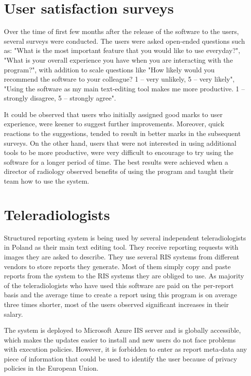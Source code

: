 \documentclass[12pt, twoside, openany]{report}
\theoremstyle{definition}
\begin{document}
\section{User satisfaction surveys}
Over the time of first few months after the release of the software to the  users, several surveys were conducted. The users were asked open-ended questions such as: "What is the most important feature that you would like to use everyday?", "What is your overall experience you have when you are interacting with the program?", with addition to scale questions like "How likely would you recommend the software to your colleague? 1 – very unlikely, 5 – very likely", "Using the software as my main text-editing tool makes me more productive. 1 – strongly disagree, 5 – strongly agree".

It could be observed that users who initially assigned good marks to user experience, were keener to suggest further improvements. Moreover, quick reactions to the suggestions, tended to result in better marks in the subsequent surveys. On the other hand, users that were not interested in using additional tools to be more productive, were very difficult to encourage to try using the software for a longer period of time. The best results were achieved when a director of radiology observed benefits of using the program and taught their team how to use the system.


\section{Teleradiologists}
Structured reporting system is being used by several independent teleradiologists in Poland as their main text editing tool. They receive reporting requests with images they are asked to describe. They use several RIS systems from different vendors to store reports they generate. Most of them simply copy and paste reports from the system to the RIS systems they are obliged to use. As majority of the teleradiologists who have used this software are paid on the per-report basis and the average time to create a report using this program is on average three times shorter, most of the users observed significant increases in their salary. 

The system is deployed to Microsoft Azure IIS server and is globally accessible, which makes the updates easier to install and new users do not face problems with execution policies. However, it is forbidden to enter as report meta-data any piece of information that could be used to identify the user because of privacy policies in the European Union. 
\end{document}
